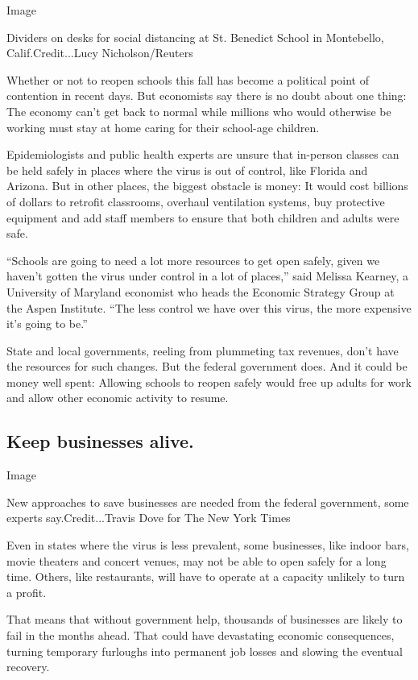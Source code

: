 Image

Dividers on desks for social distancing at St. Benedict School in
Montebello, Calif.Credit...Lucy Nicholson/Reuters

Whether or not to reopen schools this fall has become a political point
of contention in recent days. But economists say there is no doubt about
one thing: The economy can't get back to normal while millions who would
otherwise be working must stay at home caring for their school-age
children.

Epidemiologists and public health experts are unsure that in-person
classes can be held safely in places where the virus is out of control,
like Florida and Arizona. But in other places, the biggest obstacle is
money: It would cost billions of dollars to retrofit classrooms,
overhaul ventilation systems, buy protective equipment and add staff
members to ensure that both children and adults were safe.

``Schools are going to need a lot more resources to get open safely,
given we haven't gotten the virus under control in a lot of places,''
said Melissa Kearney, a University of Maryland economist who heads the
Economic Strategy Group at the Aspen Institute. ``The less control we
have over this virus, the more expensive it's going to be.''

State and local governments, reeling from plummeting tax revenues, don't
have the resources for such changes. But the federal government does.
And it could be money well spent: Allowing schools to reopen safely
would free up adults for work and allow other economic activity to
resume.

\hypertarget{keep-businesses-alive}{%
\subsection{Keep businesses alive.}\label{keep-businesses-alive}}

Image

New approaches to save businesses are needed from the federal
government, some experts say.Credit...Travis Dove for The New York Times

Even in states where the virus is less prevalent, some businesses, like
indoor bars, movie theaters and concert venues, may not be able to open
safely for a long time. Others, like restaurants, will have to operate
at a capacity unlikely to turn a profit.

That means that without government help, thousands of businesses are
likely to fail in the months ahead. That could have devastating economic
consequences, turning temporary furloughs into permanent job losses and
slowing the eventual recovery.


